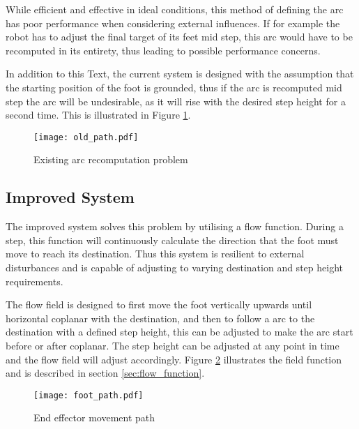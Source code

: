             \newpage
            \noindent
            While efficient and effective in ideal conditions, this method of defining the arc has poor performance when considering external
            influences. If for example the robot has to adjust the final target of its feet mid step, this arc would have to be recomputed in its entirety,
            thus leading to possible performance concerns.

            In addition to this Text, the current system is designed with the assumption that the starting position of the foot is grounded, thus if the arc is recomputed
            mid step the arc will be undesirable, as it will rise with the desired step height for a second time. This is illustrated in Figure \ref{fig:old_arc}.

            \begin{figure}[h]
                \centering
                \hspace{-1.38cm}
                \texttt{[image: old\_path.pdf]}
                \caption{Existing arc recomputation problem}
                \label{fig:old_arc}
            \end{figure}

        \newpage
        \subsection{Improved System}
            The improved system solves this problem by utilising a flow function. During a step, this function will continuously calculate the
            direction that the foot must move to reach its destination. Thus this system is resilient to external disturbances and is capable of adjusting to
            varying destination and step height requirements. 
            
            The flow field is designed to first move the foot vertically upwards until horizontal coplanar with the destination, and then to follow a
            arc to the destination with a defined step height, this can be adjusted to make the arc start before or after coplanar. The step height can be adjusted at any point in time and the flow field will adjust accordingly.
            Figure \ref{fig:foot_arc} illustrates the field function and is described in section \ref{sec:flow_function}.
            \begin{figure}[h]
                \centering
                \hspace{-1.38cm}
                \texttt{[image: foot\_path.pdf]}
                \caption{End effector movement path}
                \label{fig:foot_arc}
            \end{figure}

